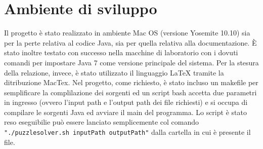 %
%

\section{Ambiente di sviluppo}
Il progetto \`{e} stato realizzato in ambiente Mac OS (versione Yosemite 10.10) sia per la perte relativa al codice Java,
sia per quella relativa alla documentazione.
\`{E} stato inoltre testato con successo nella macchine di laboratorio con i dovuti comandi per impostare Java 7 come
versione principale del sistema.
Per la stesura della relazione, invece, \`{e} stato utilizzato il linguaggio \LaTeX{}  tramite la ditribuzione MacTex.
Nel progetto, come richiesto, \`{e} stato incluso un makefile per semplificare la complilazione dei sorgenti ed un script bash
accetta due parametri in ingresso (ovvero l'input path e l'output path dei file richiesti) e si occupa di compilare le sorgenti
Java ed avviare il main del programma. Lo script è stato reso eseguibilie può essere lanciato semplicemente col comando
 \texttt{"./puzzlesolver.sh inputPath outputPath"} dalla cartella in cui è presente il file.
